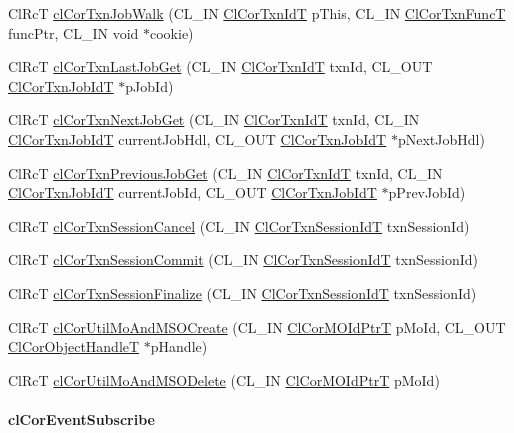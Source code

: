 \begin{CompactItemize}
\item 
Cl\-Rc\-T \hyperlink{group__group13_ga66}{cl\-Cor\-Txn\-Job\-Walk} (CL\_\-IN \hyperlink{group__group13_ga17}{Cl\-Cor\-Txn\-Id\-T} p\-This, CL\_\-IN \hyperlink{group__group13_ga60}{Cl\-Cor\-Txn\-Func\-T} func\-Ptr, CL\_\-IN void $\ast$cookie)
\item 
Cl\-Rc\-T \hyperlink{group__group13_ga79}{cl\-Cor\-Txn\-Last\-Job\-Get} (CL\_\-IN \hyperlink{group__group13_ga17}{Cl\-Cor\-Txn\-Id\-T} txn\-Id, CL\_\-OUT \hyperlink{group__group13_ga18}{Cl\-Cor\-Txn\-Job\-Id\-T} $\ast$p\-Job\-Id)
\item 
Cl\-Rc\-T \hyperlink{group__group13_ga80}{cl\-Cor\-Txn\-Next\-Job\-Get} (CL\_\-IN \hyperlink{group__group13_ga17}{Cl\-Cor\-Txn\-Id\-T} txn\-Id, CL\_\-IN \hyperlink{group__group13_ga18}{Cl\-Cor\-Txn\-Job\-Id\-T} current\-Job\-Hdl, CL\_\-OUT \hyperlink{group__group13_ga18}{Cl\-Cor\-Txn\-Job\-Id\-T} $\ast$p\-Next\-Job\-Hdl)
\item 
Cl\-Rc\-T \hyperlink{group__group13_ga81}{cl\-Cor\-Txn\-Previous\-Job\-Get} (CL\_\-IN \hyperlink{group__group13_ga17}{Cl\-Cor\-Txn\-Id\-T} txn\-Id, CL\_\-IN \hyperlink{group__group13_ga18}{Cl\-Cor\-Txn\-Job\-Id\-T} current\-Job\-Id, CL\_\-OUT \hyperlink{group__group13_ga18}{Cl\-Cor\-Txn\-Job\-Id\-T} $\ast$p\-Prev\-Job\-Id)
\item 
Cl\-Rc\-T \hyperlink{group__group13_ga68}{cl\-Cor\-Txn\-Session\-Cancel} (CL\_\-IN \hyperlink{group__group13_ga16}{Cl\-Cor\-Txn\-Session\-Id\-T} txn\-Session\-Id)
\item 
Cl\-Rc\-T \hyperlink{group__group13_ga67}{cl\-Cor\-Txn\-Session\-Commit} (CL\_\-IN \hyperlink{group__group13_ga16}{Cl\-Cor\-Txn\-Session\-Id\-T} txn\-Session\-Id)
\item 
Cl\-Rc\-T \hyperlink{group__group13_ga69}{cl\-Cor\-Txn\-Session\-Finalize} (CL\_\-IN \hyperlink{group__group13_ga16}{Cl\-Cor\-Txn\-Session\-Id\-T} txn\-Session\-Id)
\item 
Cl\-Rc\-T \hyperlink{group__group13_ga143}{cl\-Cor\-Util\-Mo\-And\-MSOCreate} (CL\_\-IN \hyperlink{struct_cl_cor_m_o_id}{Cl\-Cor\-MOId\-Ptr\-T} p\-Mo\-Id, CL\_\-OUT \hyperlink{struct_cl_cor_object_handle}{Cl\-Cor\-Object\-Handle\-T} $\ast$p\-Handle)
\item 
Cl\-Rc\-T \hyperlink{group__group13_ga144}{cl\-Cor\-Util\-Mo\-And\-MSODelete} (CL\_\-IN \hyperlink{struct_cl_cor_m_o_id}{Cl\-Cor\-MOId\-Ptr\-T} p\-Mo\-Id)
\end{CompactItemize}
\hypertarget{pagecor301}{}\paragraph{cl\-Cor\-Event\-Subscribe}\label{pagecor301}
